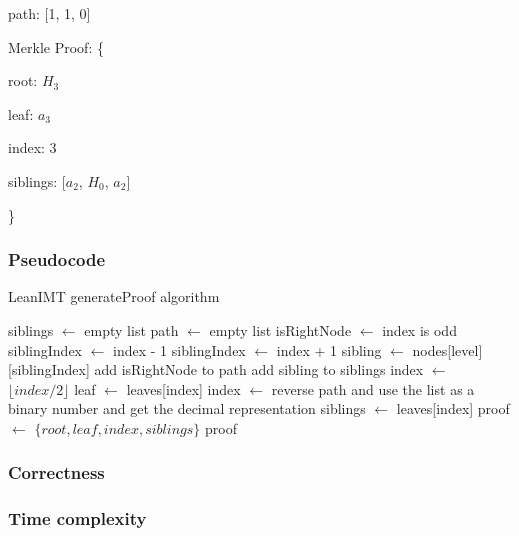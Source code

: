 \documentclass{article}
\begin{document}
path: [1, 1, 0]

Merkle Proof: \{

root: $H_3$

leaf: $a_3$

index: 3

siblings: [$a_2$, $H_0$, $a_2$]

\}

\subsubsection{Pseudocode}

\begin{algorithm}[H]
    \caption{LeanIMT generateProof algorithm}\label{generateProof}
    \begin{algorithmic}[1]
        \State siblings $\gets$ empty list 
        \State path $\gets$ empty list 
        \State isRightNode $\gets$ index is odd
         
        \State siblingIndex $\gets$ index - 1
        \Else {}
        \State siblingIndex $\gets$ index + 1
        \EndIf
        \State sibling $\gets$ nodes[level][siblingIndex]
        \State add isRightNode to path
        \State add sibling to siblings
        \EndIf
        \State index $\gets$ $\lfloor index/2 \rfloor$ 
        \EndFor
        \State leaf $\gets$ leaves[index]
        \State index $\gets$ reverse path and use the list as a binary number and get the decimal representation
        \State siblings $\gets$ leaves[index]
        \State proof $\gets$ $\{root, leaf , index, siblings \}$
        \State \Return proof
        \EndProcedure
    \end{algorithmic}
\end{algorithm}



\subsubsection{Correctness}



\subsubsection{Time complexity}
\end{document}
